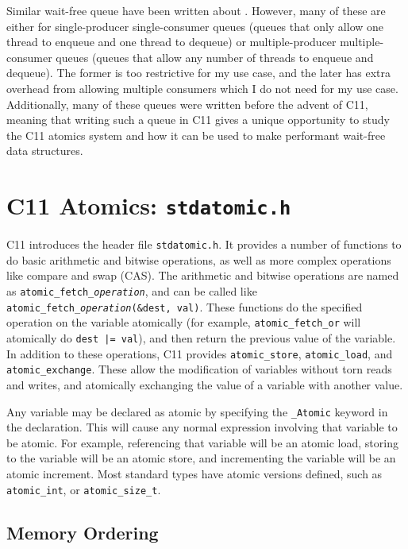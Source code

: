 \documentclass[12pt]{article}
\begin{document}
Similar wait-free queue have been written about \cite{david2004single}
\cite{kogan2011wait} \cite{valois1994implementing}. However, many of these are either
for single-producer single-consumer queues (queues that only allow one thread to enqueue
and one thread to dequeue) or multiple-producer multiple-consumer queues (queues that allow
any number of threads to enqueue and dequeue). The former is too restrictive for my use case, and the
later has extra overhead from allowing multiple consumers which I do not need for my
use case. Additionally, many of these queues were written before the advent of C11, meaning
that writing such a queue in C11 gives a unique opportunity to study the C11 atomics system
and how it can be used to make performant wait-free data structures.

\section{C11 Atomics: \texttt{stdatomic.h}}

C11 introduces the header file \texttt{stdatomic.h}. It provides a number of functions to do
basic arithmetic and bitwise operations, as well as more complex operations like compare and
swap (CAS). The arithmetic and bitwise operations are named as \texttt{atomic\_fetch\_\textit{operation}},
and can be called like \texttt{atomic\_fetch\_\textit{operation}(\&dest, val)}.
These functions do the specified operation on the variable
atomically (for example, \texttt{atomic\_fetch\_or} will atomically do \texttt{dest |= val}), and then return
the previous value of the variable. In addition to these operations, C11 provides \texttt{atomic\_store}, \texttt{atomic\_load}, and \texttt{atomic\_exchange}.
These allow the modification of variables without torn reads and writes, and atomically exchanging the value of
a variable with another value.

Any variable may be declared as atomic by specifying the \texttt{\_Atomic} keyword in the declaration.
This will cause any normal expression involving that variable to be atomic. For example, referencing
that variable will be an atomic load, storing to the variable will be an atomic store, and incrementing
the variable will be an atomic increment. Most standard types have atomic versions defined, such as
\texttt{atomic\_int}, or \texttt{atomic\_size\_t}.

\subsection{Memory Ordering}
\end{document}
